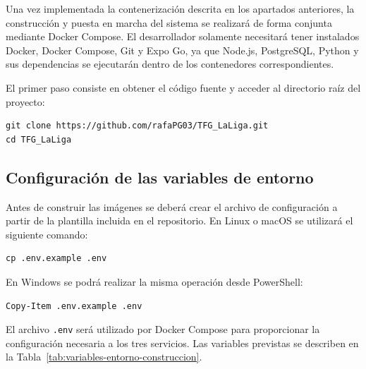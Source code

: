 Una vez implementada la contenerizaci\'on descrita en los apartados anteriores,
la construcci\'on y puesta en marcha del sistema se realizar\'a de forma conjunta
mediante Docker Compose. El desarrollador solamente necesitar\'a tener instalados
Docker, Docker Compose, Git y Expo Go, ya que Node.js, PostgreSQL, Python y sus
dependencias se ejecutar\'an dentro de los contenedores correspondientes.

El primer paso consiste en obtener el c\'odigo fuente y acceder al directorio ra\'iz
del proyecto:

\begin{lstlisting}
git clone https://github.com/rafaPG03/TFG_LaLiga.git
cd TFG_LaLiga
\end{lstlisting}

\subsection{Configuraci\'on de las variables de entorno}

Antes de construir las im\'agenes se deber\'a crear el archivo de configuraci\'on
a partir de la plantilla incluida en el repositorio. En Linux o macOS se utilizar\'a
el siguiente comando:

\begin{lstlisting}
cp .env.example .env
\end{lstlisting}

En Windows se podr\'a realizar la misma operaci\'on desde PowerShell:

\begin{lstlisting}
Copy-Item .env.example .env
\end{lstlisting}

El archivo \texttt{.env} ser\'a utilizado por Docker Compose para proporcionar la
configuraci\'on necesaria a los tres servicios. Las variables previstas se describen
en la Tabla~\ref{tab:variables-entorno-construccion}.

